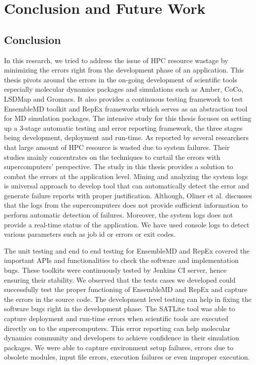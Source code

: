 \documentclass[10pt]{ruthesis}
\begin{document}
\chapter{Conclusion and Future Work}

\section{Conclusion}
In this research, we tried to address the issue of HPC resource wastage by minimizing the errors right from the development phase of an application. This thesis pivots around the errors in the on-going development of scientific tools especially molecular dynamics packages and simulations such as Amber, CoCo, LSDMap and Gromacs. It also provides a continuous testing framework to test EnsembleMD toolkit and RepEx frameworks which serves as an abstraction tool for MD simulation packages. The intensive study for this thesis focuses on setting up a 3-stage automatic testing and error reporting framework, the three stages being development, deployment and run-time. As reported by several researchers that large amount of HPC resource is wasted due to system failures. Their studies mainly concentrates on the techniques to curtail the errors with supercomputers' perspective. The study in this thesis provides a solution to combat the errors at the application level. Mining and analyzing the system logs is universal approach to develop tool that can automatically detect the error and generate failure reports with proper justification. Although, Oliner et al. \cite{ref14} discusses that the logs from the supercomputers does not provide sufficient information to perform automatic detection of failures. Moreover, the system logs does not provide a real-time status of the application. We have used console logs to detect various parameters such as job id or errors or exit codes.

The unit testing and end to end testing for EnsembleMD and RepEx covered the important APIs and functionalities to check the software and implementation bugs. These toolkits were continuously tested by Jenkins CI server, hence ensuring their stability. We observed that the tests cases we developed could successfully test the proper functioning of EnsembleMD and RepEx and capture the errors in the source code. The development level testing can help in fixing the software bugs right in the development phase. The SATLite tool was able to capture deployment and run-time errors when scientific tools are executed directly on to the supercomputers. This error reporting can help molecular dynamics community and developers to achieve confidence in their simulation packages. We were able to capture environment setup failures, errors due to obsolete modules, input file errors, execution failures or even improper execution. 
\end{document}
